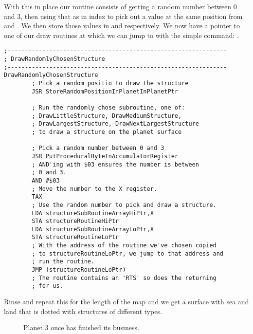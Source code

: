 With this in place our routine consists of getting a random number between 0 and 3, then using that as in index to pick
out a value at the same position from  and .
We then store those values in  and  respectively. We now
have a pointer to one of our draw routines at  which we can jump to with the simple
command: . 


\begin{lstlisting}[caption=\icode{DrawRandomlyChosenStructure} picks a random position and a random draw routine to use at that position.]
;---------------------------------------------------------------
; DrawRandomlyChosenStructure
;---------------------------------------------------------------
DrawRandomlyChosenStructure
        ; Pick a random positio to draw the structure
        JSR StoreRandomPositionInPlanetInPlanetPtr

        ; Run the randomly chose subroutine, one of:
        ; DrawLittleStructure, DrawMediumStructure,
        ; DrawLargestStructure, DrawNextLargestStructure
        ; to draw a structure on the planet surface

        ; Pick a random number between 0 and 3
        JSR PutProceduralByteInAccumulatorRegister
        ; AND'ing with $03 ensures the number is between
        ; 0 and 3.
        AND #$03
        ; Move the number to the X register.
        TAX
        ; Use the random number to pick and draw a structure.
        LDA structureSubRoutineArrayHiPtr,X
        STA structureRoutineHiPtr
        LDA structureSubRoutineArrayLoPtr,X
        STA structureRoutineLoPtr
        ; With the address of the routine we've chosen copied
        ; to structureRoutineLoPtr, we jump to that address and
        ; run the routine.
        JMP (structureRoutineLoPtr)
        ; The routine contains an 'RTS' so does the returning
        ; for us.
\end{lstlisting}

Rinse and repeat this for the length of the map and we get a surface with sea and land that is dotted with structures
of different types.

\begin{figure}[H]
  {
    \begin{adjustbox}{width=10cm,center}
    \end{adjustbox}
  }\caption[]{Planet 3 once  has finished its business.}
\end{figure}

